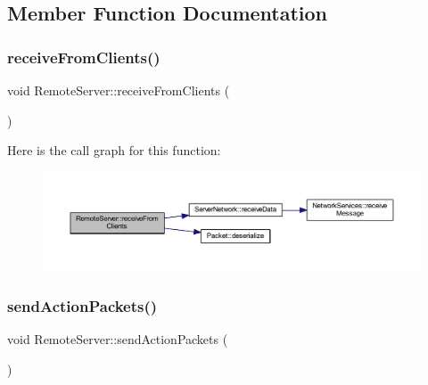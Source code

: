 \subsection{Member Function Documentation}
\mbox{\label{class_remote_server_a4e2bc7c80cd666ad3ad9126c3ffee844}} 
\subsubsection{\texorpdfstring{receive\+From\+Clients()}{receiveFromClients()}}
{\footnotesize\ttfamily void Remote\+Server\+::receive\+From\+Clients (\begin{DoxyParamCaption}{ }\end{DoxyParamCaption})}

Here is the call graph for this function\+:
\nopagebreak
\begin{figure}[H]
\begin{center}
\leavevmode
\includegraphics[width=350pt]{class_remote_server_a4e2bc7c80cd666ad3ad9126c3ffee844_cgraph}
\end{center}
\end{figure}
\mbox{\label{class_remote_server_a5469a07c01cff2b4f33962ad2e9d62e6}} 
\subsubsection{\texorpdfstring{send\+Action\+Packets()}{sendActionPackets()}}
{\footnotesize\ttfamily void Remote\+Server\+::send\+Action\+Packets (\begin{DoxyParamCaption}{ }\end{DoxyParamCaption})}

